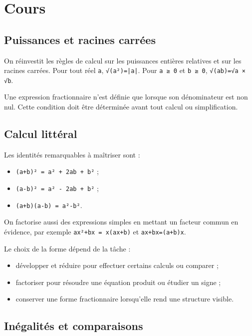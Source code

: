 \section{Cours}

\subsection{Puissances et racines carrées}

On réinvestit les règles de calcul sur les puissances entières relatives et sur les racines carrées. Pour tout réel \texttt{a}, \texttt{√(a²)=|a|}. Pour \texttt{a ≥ 0} et \texttt{b ≥ 0}, \texttt{√(ab)=√a × √b}.

Une expression fractionnaire n'est définie que lorsque son dénominateur est non nul. Cette condition doit être déterminée avant tout calcul ou simplification.

\subsection{Calcul littéral}

Les identités remarquables à maîtriser sont :

\begin{itemize}
\item \texttt{(a+b)² = a² + 2ab + b²} ;
\item \texttt{(a-b)² = a² - 2ab + b²} ;
\item \texttt{(a+b)(a-b) = a²-b²}.
\end{itemize}

On factorise aussi des expressions simples en mettant un facteur commun en évidence, par exemple \texttt{ax²+bx = x(ax+b)} et \texttt{ax+bx=(a+b)x}.

Le choix de la forme dépend de la tâche :

\begin{itemize}
\item développer et réduire pour effectuer certains calculs ou comparer ;
\item factoriser pour résoudre une équation produit ou étudier un signe ;
\item conserver une forme fractionnaire lorsqu'elle rend une structure visible.
\end{itemize}

\subsection{Inégalités et comparaisons}

